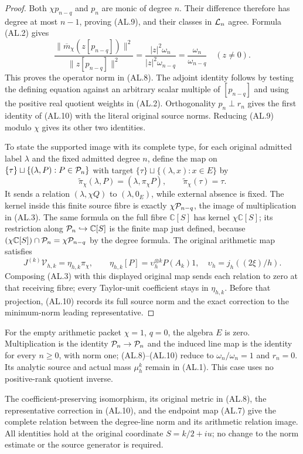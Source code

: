 \begin{proof}
Both $\chi p_{n-q}$ and $p_n$ are monic of degree $n$. Their difference
therefore has degree at most $n-1$, proving (AL.9), and their classes in
$\mathcal L_n$ agree. Formula (AL.2) gives
\[
 \frac{\|\overline m_\chi(z[p_{n-q}])\|^2}{\|z[p_{n-q}]\|^2}
 =\frac{|z|^2\omega_n}{|z|^2\omega_{n-q}}
 =\frac{\omega_n}{\omega_{n-q}}\quad(z\ne0).
\]
This proves the operator norm in (AL.8). The adjoint identity follows by
testing the defining equation against an arbitrary scalar multiple of
$[p_{n-q}]$ and using the positive real quotient weights in (AL.2).
Orthogonality $p_n\perp r_n$ gives the first identity of (AL.10) with the
literal original source norms. Reducing (AL.9) modulo $\chi$ gives its other
two identities.

To state the supported image with its complete type, for each original
admitted label $\lambda$ and the fixed admitted degree $n$, define the map
on $\{\tau\}\sqcup\{(\lambda,P):P\in\mathcal P_n\}$ with target
$\{\tau\}\sqcup\{(\lambda,x):x\in E\}$ by
\[
 \widetilde\pi_\chi(\lambda,P)=(\lambda,\pi_\chi P),
 \qquad \widetilde\pi_\chi(\tau)=\tau.
\]
It sends a relation $(\lambda,\chi Q)$ to $(\lambda,0_E)$, while external
absence is fixed. The kernel inside this finite source fibre is exactly
$\chi\mathcal P_{n-q}$, the image of multiplication in (AL.3). The same formula
on the full fibre $\mathbb C[S]$ has kernel $\chi\mathbb C[S]$;
its restriction along $\mathcal P_n\hookrightarrow\mathbb C[S]$ is the finite
map just defined, because
$(\chi\mathbb C[S])\cap\mathcal P_n=\chi\mathcal P_{n-q}$ by the degree formula.
The original arithmetic map satisfies
\begin{equation}\tag{AL.11}
 J^{(k)}\mathcal V_{h,k}=\eta_{h,k}\pi_\chi,\qquad
 \eta_{h,k}[P]=\upsilon_h^{\otimes k}P(A_k)1,
 \quad \upsilon_h=j_h((2\xi)/h).
\end{equation}
Composing (AL.3) with this displayed original map sends each relation to
zero at that receiving fibre; every Taylor-unit coefficient stays in
$\eta_{h,k}$. Before that projection, (AL.10) records its full source norm
and the exact correction to the minimum-norm leading representative.
\end{proof}

For the empty arithmetic packet $\chi=1$, $q=0$, the algebra $E$ is zero.
Multiplication is the identity $\mathcal P_n\to\mathcal P_n$ and the induced line map
is the identity for every $n\ge0$, with norm one; (AL.8)--(AL.10) reduce to
$\omega_n/\omega_n=1$ and $r_n=0$. Its analytic source and actual mass
$\mu_h^k$ remain in (AL.1). This case uses no positive-rank quotient inverse.

The coefficient-preserving isomorphism, its original metric in (AL.8), the
representative correction in (AL.10), and the endpoint map (AL.7) give the
complete relation between the degree-line norm and its arithmetic relation
image. All identities hold at the original coordinate $S=k/2+iu$; no change
to the norm estimate or the source generator is required.

\endgroup
